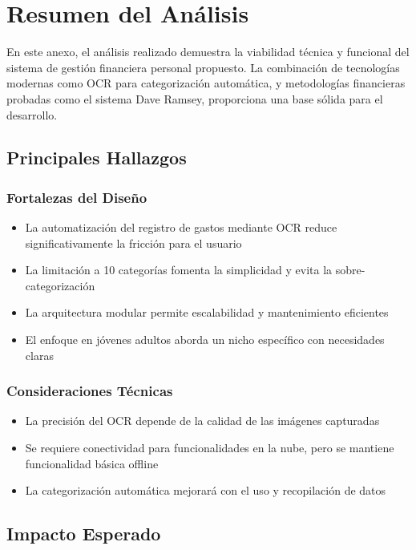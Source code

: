 \chapter{Resumen del Análisis}

En este anexo, el análisis realizado demuestra la viabilidad técnica y funcional del sistema de gestión financiera personal propuesto. 
La combinación de tecnologías modernas como OCR para categorización automática, y metodologías financieras probadas como el sistema Dave Ramsey, 
proporciona una base sólida para el desarrollo.

\section{Principales Hallazgos}

\subsection{Fortalezas del Diseño}
\begin{itemize}
    \item La automatización del registro de gastos mediante OCR reduce significativamente la fricción para el usuario
    \item La limitación a 10 categorías fomenta la simplicidad y evita la sobre-categorización
    \item La arquitectura modular permite escalabilidad y mantenimiento eficientes
    \item El enfoque en jóvenes adultos aborda un nicho específico con necesidades claras
\end{itemize}

\subsection{Consideraciones Técnicas}
\begin{itemize}
    \item La precisión del OCR depende de la calidad de las imágenes capturadas
    \item Se requiere conectividad para funcionalidades en la nube, pero se mantiene funcionalidad básica offline
    \item La categorización automática mejorará con el uso y recopilación de datos
\end{itemize}

\section{Impacto Esperado}

